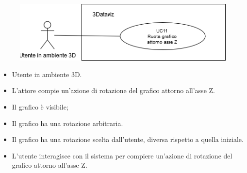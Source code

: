 \begin{figure}[h!]
    \centering
    \includegraphics[scale=0.65]{template/images/UC11.png}
    \caption{}
\end{figure}
\UCdsc
{ %
    \begin{itemize}
        \item Utente in ambiente 3D.
    \end{itemize}
}
{ %
    \begin{itemize}
        \item L'attore compie un'azione di rotazione del grafico attorno all'asse Z.
    \end{itemize}
}
{ %
    \begin{itemize}
        \item Il grafico è visibile;
        \item Il grafico ha una rotazione arbitraria.
    \end{itemize}
}
{ %
    \begin{itemize}
        \item Il grafico ha una rotazione scelta dall'utente, diversa rispetto a quella iniziale.
    \end{itemize}
}
{ %
    \begin{itemize}
        \item L'utente interagisce con il sistema per compiere un'azione di rotazione del grafico attorno all'asse Z.
    \end{itemize}
}
    

